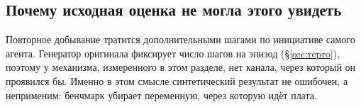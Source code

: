 \subsection{Почему исходная оценка не могла этого увидеть}

Повторное добывание тратится дополнительными шагами по инициативе самого
агента. Генератор оригинала фиксирует число шагов на эпизод
(\S\ref{sec:repro}), поэтому у механизма, измеренного в этом разделе, нет
канала, через который он проявился бы. Именно в этом смысле синтетический
результат не ошибочен, а неприменим: бенчмарк убирает переменную, через
которую идёт плата.
